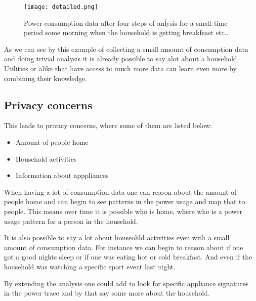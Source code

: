 \begin{figure}
  \begin{center}
    \texttt{[image: detailed.png]}
  \end{center}
  \caption{Power consumption data after four steps of anĺysis for a small time period some morning when the household is getting breakfeast etc..}
  \label{detailed_consumption}
\end{figure}


As we can see by this example of collecting a small amount of consumption data and doing trivial analysis it is already possible to say alot about a household.
Utilities or alike that have access to much more data can learn even more by combining their knowledge.

\subsection{Privacy concerns}\label{privacy_concerns}
This leads to privacy concerns, where some of them are listed below:
\begin{itemize}
  \item Amount of people home
  \item Household activities
  \item Information about apppliances
\end{itemize}

When having a lot of consumption data one can reason about the amount of people home and can begin to see patterns in the power usage and map that to people.
This means over time it is possible who is home, where who is a power usage pattern for a person in the household.

It is also possible to say a lot about houseohld activities even with a small amount of consumption data.
For instance we can begin to reason about if one got a good nights sleep or if one was eating hot or cold breakfast.
And even if the household was watching a specific sport event last night.

By extending the analysis one could add to look for specific appliance signatures in the power trace and by that say some more about the household.\cite{NILM}
